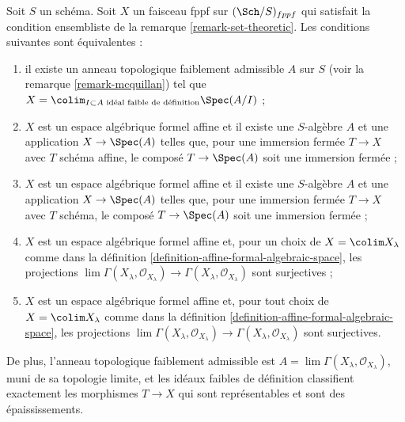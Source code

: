 \begin{lemma}
\label{lemma-mcquillan-affine-formal-algebraic-space}
Soit $S$ un schéma. Soit $X$ un faisceau fppf sur $(\Sch/S)_{fppf}$
qui satisfait la condition ensembliste de la
remarque \ref{remark-set-theoretic}.
Les conditions suivantes sont équivalentes :
\begin{enumerate}
\item il existe un anneau topologique faiblement admissible $A$ sur $S$
(voir la remarque \ref{remark-mcquillan}) tel que
$X = \colim_{I \subset A\text{ idéal faible de définition}} \Spec(A/I)$ ;
\item $X$ est un espace algébrique formel affine et
il existe une $S$-algèbre $A$ et une application $X \to \Spec(A)$
telles que, pour une immersion fermée $T \to X$ avec $T$ schéma affine,
le composé $T \to \Spec(A)$ soit une immersion fermée ;
\item $X$ est un espace algébrique formel affine et
il existe une $S$-algèbre $A$ et une application $X \to \Spec(A)$
telles que, pour une immersion fermée $T \to X$ avec $T$ schéma,
le composé $T \to \Spec(A)$ soit une immersion fermée ;
\item $X$ est un espace algébrique formel affine et, pour un choix de
$X = \colim X_\lambda$ comme dans
la définition \ref{definition-affine-formal-algebraic-space},
les projections $\lim \Gamma(X_\lambda, \mathcal{O}_{X_\lambda})
\to \Gamma(X_\lambda, \mathcal{O}_{X_\lambda})$ sont surjectives ;
\item $X$ est un espace algébrique formel affine et, pour tout choix
de $X = \colim X_\lambda$ comme dans
la définition \ref{definition-affine-formal-algebraic-space},
les projections $\lim \Gamma(X_\lambda, \mathcal{O}_{X_\lambda})
\to \Gamma(X_\lambda, \mathcal{O}_{X_\lambda})$ sont surjectives.
\end{enumerate}
De plus, l'anneau topologique faiblement admissible est
$A = \lim \Gamma(X_\lambda, \mathcal{O}_{X_\lambda})$,
muni de sa topologie limite, et les idéaux faibles de définition
classifient exactement les morphismes $T \to X$ qui sont représentables
et sont des épaississements.
\end{lemma}

